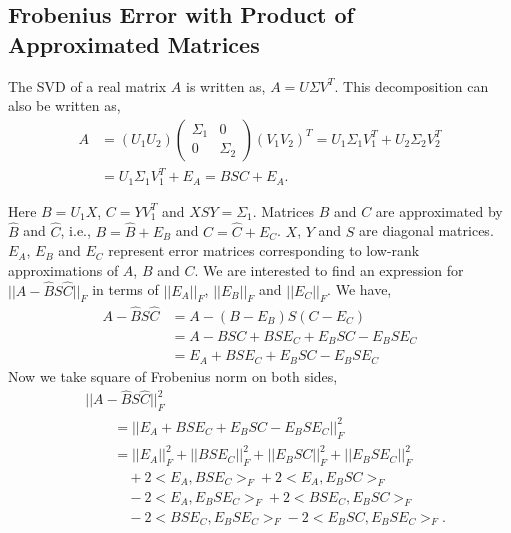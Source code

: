 \documentclass[sigconf]{acmart}
\begin{document}
\subsection{Frobenius Error with Product of Approximated Matrices}
\label{sec:approaches:approxproduct}

The SVD of a real matrix $A$ is written as, $A=U\Sigma V^T$. This decomposition can also be written as,
\begin{align*}
A&=(U_1 U_2)\begin{pmatrix}
\Sigma_1 & 0\\
0 & \Sigma_2
\end{pmatrix}(V_1 V_2)^T = U_1\Sigma_1 V_1^T + U_2 \Sigma_2 V_2^T\\
&= U_1\Sigma_1 V_1^T + E_A = BSC + E_A.
\end{align*}

\noindent Here $B = U_1 X$, $C=YV_1^T$ and $XSY = \Sigma_1$. Matrices $B$ and $C$ are approximated by $\hat{B}$ and $\hat{C}$, i.e., $B = \hat{B} + E_B$ and $C = \hat{C} + E_C$. $X$, $Y$ and $S$ are diagonal matrices. $E_A$, $E_B$ and $E_C$ represent error matrices corresponding to low-rank approximations of $A$, $B$ and $C$. We are interested to find an expression for $||A - \hat{B} S \hat{C}||_F$ in terms of $||E_A||_F$, $||E_B||_F$ and $||E_C||_F$. We have,
\begin{align*}
A - \hat{B} S \hat{C} &= A - (B-E_B)S(C-E_C)\\
&= A - BSC + BSE_C + E_BSC - E_BSE_C\\
&= E_A + BSE_C + E_BSC - E_BSE_C
\end{align*}
Now we take square of Frobenius norm on both sides,
\begin{align*}
&||A - \hat{B} S \hat{C}||_F^2 \\ 
&\qquad= ||E_A + BSE_C + E_BSC - E_BSE_C||_F^2 \\
&\qquad= ||E_A||_F^2 + ||BSE_C||_F^2 + ||E_BSC||_F^2 + ||E_BSE_C||_F^2 \\
&\qquad\quad + 2\boldsymbol{<}E_A, BSE_C\boldsymbol{>}_F + 2<E_A, E_BSC>_F \\
&\qquad\quad -2 <E_A, E_BSE_C>_F + 2 <BSE_C, E_BSC>_F \\
&\qquad\quad -2 <BSE_C, E_BSE_C>_F - 2<E_BSC, E_BSE_C>_F.
\end{align*}
\end{document}
